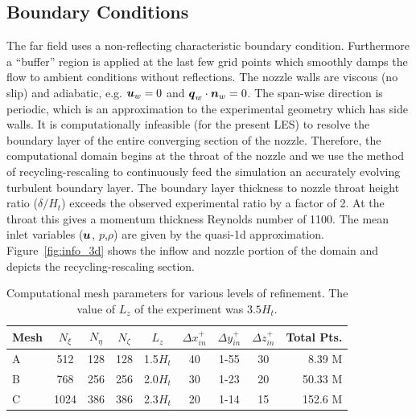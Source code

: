 \documentclass[]{aiaa-tc}%
\def\bgk#1{\mbox{\boldmath $#1$}}
\def\vec#1{\bgk{ #1}}
\begin{document}


\subsection{Boundary Conditions}

The far field uses a non-reflecting characteristic boundary condition\cite{Poinsot:92}.  Furthermore a ``buffer'' region is applied at the last few grid points which smoothly damps the flow to ambient conditions without reflections.  The nozzle walls are viscous (no slip) and adiabatic, e.g. $\vec{u}_w=0$ and $\vec{q}_w\cdot\vec{n}_w = 0$.  The span-wise direction is periodic, which is an approximation to the experimental geometry which has side walls.  It is computationally infeasible (for the present LES) to resolve the boundary layer of the entire converging section of the nozzle.  Therefore, the computational domain begins at the throat of the nozzle and we use the method of recycling-rescaling\cite{Lund:98} to continuously feed the simulation an accurately evolving turbulent boundary layer.  The boundary layer thickness to nozzle throat height ratio ($\delta/H_t$) exceeds the observed experimental ratio by a factor of 2.  At the throat this gives a momentum thickness Reynolds number of 1100.  The mean inlet variables ($\vec{u}$, $p$,$\rho$) are given by the quasi-1d approximation.  Figure~\ref{fig:info_3d} shows the inflow and nozzle portion of the domain and depicts the recycling-rescaling section.


\begin{table}[!h]

\begin{center}
	\caption{Computational mesh parameters for various levels of refinement.  The value of $L_z$ of the experiment\cite{Papam:10} was $3.5H_t$.
	\label{tbl:mesh}
	}
	\begin{tabular}{lcccccccr}
	\hline 
	Mesh & $N_{\xi}$ & $N_{\eta}$ & $N_{\zeta}$ & $L_z$ & $\Delta x^+_{in}$ & $\Delta y^+_{in}$ & $\Delta z^+_{in}$ & Total Pts.\\
	\hline 
	A & 512 & 128 &              128            & 1.5$H_t$ & 40 & 1-55 & 30 & 8.39 M \\
	B & 768 & 256 &              256           & 2.0$H_t$ & 30 & 1-23 & 20 & 50.33 M \\
	C & 1024 & 386 &              386            & 2.3$H_t$ & 20 & 1-14 & 15 & 152.6 M
	\end{tabular}
\end{center}
\end{table}
\end{document}
